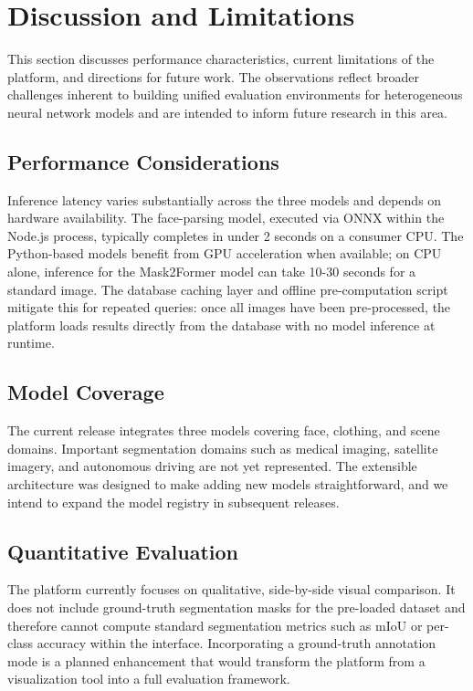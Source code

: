 \documentclass[conference,a4paper,flushend]{iaria}
\begin{document}
\section{Discussion and Limitations}
\label{sec:discussion}

This section discusses performance characteristics, current limitations of the platform, and directions for future work. The observations reflect broader challenges inherent to building unified evaluation environments for heterogeneous neural network models and are intended to inform future research in this area.

\subsection{Performance Considerations}

Inference latency varies substantially across the three models and depends on hardware availability. The face-parsing model, executed via ONNX within the Node.js process, typically completes in under 2 seconds on a consumer CPU. The Python-based models benefit from GPU acceleration when available; on CPU alone, inference for the Mask2Former model can take 10-30 seconds for a standard image. The database caching layer and offline pre-computation script mitigate this for repeated queries: once all images have been pre-processed, the platform loads results directly from the database with no model inference at runtime.

\subsection{Model Coverage}

The current release integrates three models covering face, clothing, and scene domains. Important segmentation domains such as medical imaging, satellite imagery, and autonomous driving are not yet represented. The extensible architecture was designed to make adding new models straightforward, and we intend to expand the model registry in subsequent releases.

\subsection{Quantitative Evaluation}

The platform currently focuses on qualitative, side-by-side visual comparison. It does not include ground-truth segmentation masks for the pre-loaded dataset and therefore cannot compute standard segmentation metrics such as mIoU or per-class accuracy within the interface. Incorporating a ground-truth annotation mode is a planned enhancement that would transform the platform from a visualization tool into a full evaluation framework.
\end{document}
